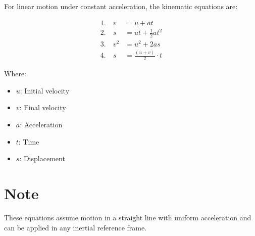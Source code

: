 \documentclass[12pt]{article}
\begin{document}
For linear motion under constant acceleration, the kinematic equations are:

\begin{align*}
1. \quad v &= u + at \\
2. \quad s &= ut + \frac{1}{2}at^2 \\
3. \quad v^2 &= u^2 + 2as \\
4. \quad s &= \frac{(u + v)}{2} \cdot t
\end{align*}

Where:
\begin{itemize}
    \item \( u \): Initial velocity
    \item \( v \): Final velocity
    \item \( a \): Acceleration
    \item \( t \): Time
    \item \( s \): Displacement
\end{itemize}

\section*{Note}
These equations assume motion in a straight line with uniform acceleration and can be applied in any inertial reference frame.
\end{document}
